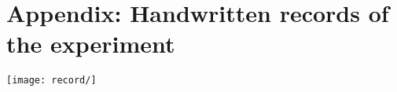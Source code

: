 \section{Appendix: Handwritten records of the experiment}
    \texttt{[image: record/]}
\clearpage

